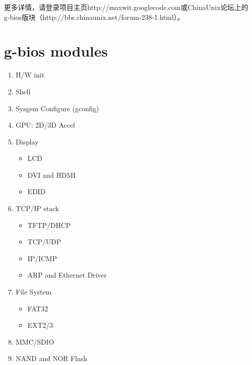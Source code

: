 更多详情，请登录项目主页http://maxwit.googlecode.com或ChinaUnix论坛上的g-bios版块（http://bbs.chinaunix.net/forum-238-1.html）。

\section{g-bios modules}
\begin{enumerate}
\item H/W init

\item Shell

\item Sysgem Configure (gconfig)

\item GPU: 2D/3D Accel

\item Display
	\begin{itemize}
	\item LCD
	\item DVI and HDMI
	\item EDID
	\end{itemize}

\item TCP/IP stack
	\begin{itemize}
	\item TFTP/DHCP
	\item TCP/UDP
	\item IP/ICMP
	\item ARP and Ethernet Driver
	\end{itemize}

\item File System
	\begin{itemize}
	\item FAT32
	\item EXT2/3
	\end{itemize}

\item MMC/SDIO

\item NAND and NOR Flash 

\end{enumerate}

